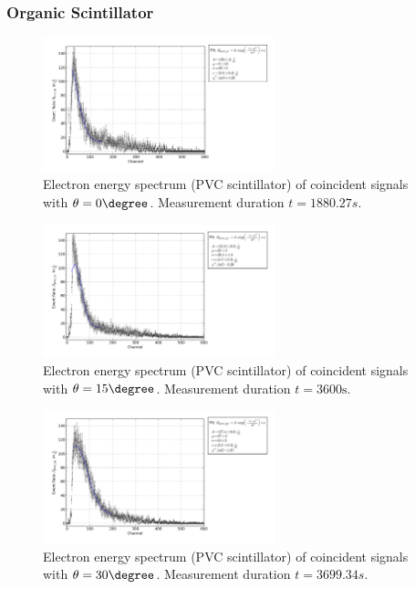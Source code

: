 \subsubsection{Organic Scintillator}
\begin{figure}[h!]
  \centering
  \includegraphics[width=0.6\textwidth]{plots/pvc_0.png}
  \caption{Electron energy spectrum (PVC scintillator) of coincident signals
  with $\theta=0\degree$. Measurement duration $t=1880.27{s}$.}
  \label{fig:pvc0}
\end{figure}
\begin{figure}[h!]
  \centering
  \includegraphics[width=0.6\textwidth]{plots/pvc_15.png}
  \caption{Electron energy spectrum (PVC scintillator) of coincident signals
  with $\theta=15\degree$. Measurement duration $t=3600\mathrm{s}$.}
  \label{fig:pvc15}
\end{figure}
\begin{figure}[h!]
  \centering
  \includegraphics[width=0.6\textwidth]{plots/pvc_30.png}
  \caption{Electron energy spectrum (PVC scintillator) of coincident signals
  with $\theta=30\degree$. Measurement duration $t=3699.34{s}$.}
  \label{fig:pvc30}
\end{figure}
